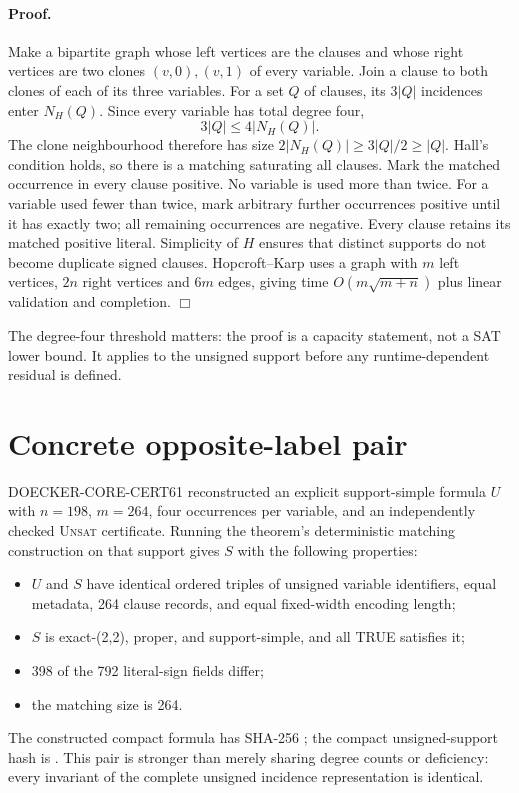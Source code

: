 \documentclass[11pt]{article}
\newcommand{\unsat}{\textsc{Unsat}}
\begin{document}
\paragraph{Proof.}
Make a bipartite graph whose left vertices are the clauses and whose right vertices are two
clones $(v,0),(v,1)$ of every variable.  Join a clause to both clones of each of its three
variables.  For a set $Q$ of clauses, its $3|Q|$ incidences enter $N_H(Q)$.  Since every
variable has total degree four,
\[
  3|Q|\leq 4|N_H(Q)|.
\]
The clone neighbourhood therefore has size
$2|N_H(Q)|\geq 3|Q|/2\geq |Q|$.  Hall's condition holds, so there is a matching saturating
all clauses.  Mark the matched occurrence in every clause positive.  No variable is used
more than twice.  For a variable used fewer than twice, mark arbitrary further occurrences
positive until it has exactly two; all remaining occurrences are negative.  Every clause
retains its matched positive literal.  Simplicity of $H$ ensures that distinct supports do
not become duplicate signed clauses.  Hopcroft--Karp uses a graph with $m$ left vertices,
$2n$ right vertices and $6m$ edges, giving time $O(m\sqrt{m+n})$ plus linear validation and
completion. \hfill$\Box$

The degree-four threshold matters: the proof is a capacity statement, not a SAT lower
bound.  It applies to the unsigned support before any runtime-dependent residual is defined.

\section{Concrete opposite-label pair}

DOECKER-CORE-CERT61 reconstructed an explicit support-simple formula $U$ with
$n=198$, $m=264$, four occurrences per variable, and an independently checked \unsat{}
certificate.  Running the theorem's deterministic matching construction on that support
gives $S$ with the following properties:
\begin{itemize}
\item $U$ and $S$ have identical ordered triples of unsigned variable identifiers, equal
metadata, 264 clause records, and equal fixed-width encoding length;
\item $S$ is exact-(2,2), proper, and support-simple, and all TRUE satisfies it;
\item 398 of the 792 literal-sign fields differ;
\item the matching size is 264.
\end{itemize}
The constructed compact formula has SHA-256
;
the compact unsigned-support hash is
.
This pair is stronger than merely sharing degree counts or deficiency: every invariant of
the complete unsigned incidence representation is identical.
\end{document}
